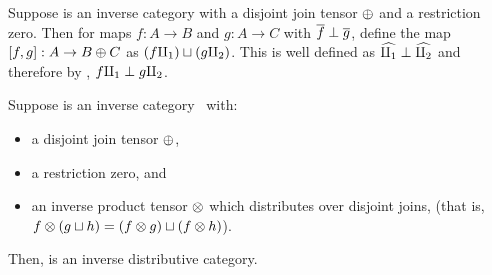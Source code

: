 \begin{definition}\label{def:join_of_perp_rst_maps}
  Suppose \X is an inverse category with a disjoint join tensor $\oplus$ and a restriction zero. Then
  for maps $f:A \to B$ and $g:A \to C$ with $\overline{f} \perp \overline{g}$, define the map $[f,g]:A \to
  B\oplus C$ as $(f \amalg_{1}) \sqcup (g \amalg_{2})$. This is well defined as $\widehat{\amalg_{1}} \perp \widehat{\amalg_{2}}$ and
  therefore by , $f\amalg_{1} \perp g\amalg_{2}$.
\end{definition}

\begin{lemma}
  Suppose \X is an inverse category \X\ with:
  \begin{itemize}
    \item a disjoint join tensor $\oplus$,
    \item a restriction zero, and
    \item an inverse  product tensor $\otimes$ which distributes over disjoint joins, (that is,
      $f\otimes(g\sqcup h) = (f\otimes g) \sqcup (f\otimes h)$).
  \end{itemize}
  Then, \X is an inverse distributive  category.
\end{lemma}
